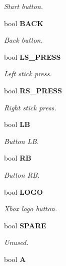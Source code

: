 \begin{DoxyCompactItemize}
\begin{DoxyCompactList}\small\item\em Start button. \end{DoxyCompactList}\item 
bool {\bf B\-A\-C\-K}\label{structbutton_aa617d468aa600e2db0ace404b6d73362}

\begin{DoxyCompactList}\small\item\em Back button. \end{DoxyCompactList}\item 
bool {\bf L\-S\-\_\-\-P\-R\-E\-S\-S}\label{structbutton_a5e73bda0e232c16c3ccf8d4f64c28112}

\begin{DoxyCompactList}\small\item\em Left stick press. \end{DoxyCompactList}\item 
bool {\bf R\-S\-\_\-\-P\-R\-E\-S\-S}\label{structbutton_a060553e2ecadce74e0f2a06990caeb9f}

\begin{DoxyCompactList}\small\item\em Right stick press. \end{DoxyCompactList}\item 
bool {\bf L\-B}\label{structbutton_ada81b06ca9633d27de104929011da3ec}

\begin{DoxyCompactList}\small\item\em Button L\-B. \end{DoxyCompactList}\item 
bool {\bf R\-B}\label{structbutton_a6d7bc7609cc3e233e0044813780ab2d4}

\begin{DoxyCompactList}\small\item\em Button R\-B. \end{DoxyCompactList}\item 
bool {\bf L\-O\-G\-O}\label{structbutton_a756d4aa3f95373a5058cb02a897d12cf}

\begin{DoxyCompactList}\small\item\em Xbox logo button. \end{DoxyCompactList}\item 
bool {\bf S\-P\-A\-R\-E}\label{structbutton_aaf3a9df2c4578bd2d3591334e0d9ace5}

\begin{DoxyCompactList}\small\item\em Unused. \end{DoxyCompactList}\item 
bool {\bf A}\label{structbutton_a014568bcfa1204a9c4ca9799c1b47102}


\end{DoxyCompactItemize}
